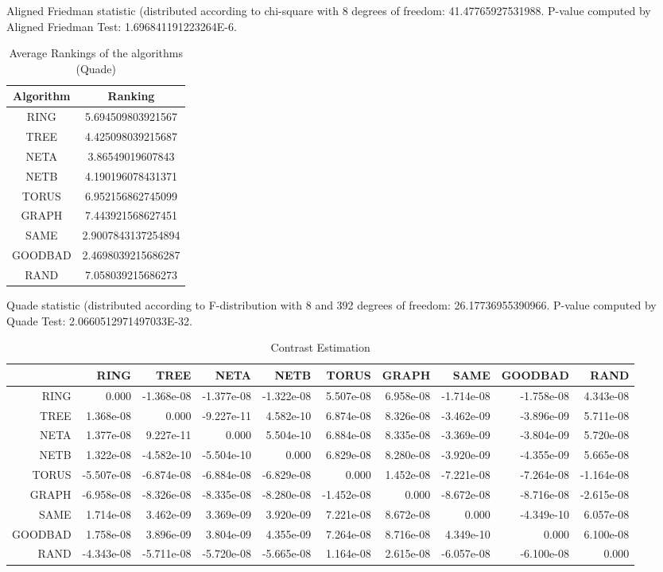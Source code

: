 \documentclass[a4paper,10pt]{article}
\begin{document}
\begin{landscape}
Aligned Friedman statistic (distributed according to chi-square with 8 degrees of freedom: 41.47765927531988. 
P-value computed by Aligned Friedman Test: 1.696841191223264E-6.\newline


\newpage

\begin{table}[!htp]
\centering
\caption{Average Rankings of the algorithms (Quade)
}\begin{tabular}{c|c}
Algorithm&Ranking\\
\hline
 RING&5.694509803921567\\
 TREE&4.425098039215687\\
 NETA&3.86549019607843\\
 NETB&4.190196078431371\\
 TORUS&6.952156862745099\\
 GRAPH&7.443921568627451\\
 SAME&2.9007843137254894\\
 GOODBAD&2.4698039215686287\\
 RAND&7.058039215686273\\
\end{tabular}
\end{table}
Quade statistic (distributed according to F-distribution with 8 and 392 degrees of freedom: 26.17736955390966. 
P-value computed by Quade Test: 2.0660512971497033E-32.\newline


\newpage

\begin{table}[!htp]
\centering\tiny
\caption{Contrast Estimation}
\begin{tabular}{
|r|r|r|r|r|r|r|r|r|r|}
\hline
 & RING& TREE& NETA& NETB& TORUS& GRAPH& SAME& GOODBAD& RAND\\
\hline
 RING&0.000&-1.368e-08&-1.377e-08&-1.322e-08&5.507e-08&6.958e-08&-1.714e-08&-1.758e-08&4.343e-08\\
\hline
 TREE&1.368e-08&0.000&-9.227e-11&4.582e-10&6.874e-08&8.326e-08&-3.462e-09&-3.896e-09&5.711e-08\\
\hline
 NETA&1.377e-08&9.227e-11&0.000&5.504e-10&6.884e-08&8.335e-08&-3.369e-09&-3.804e-09&5.720e-08\\
\hline
 NETB&1.322e-08&-4.582e-10&-5.504e-10&0.000&6.829e-08&8.280e-08&-3.920e-09&-4.355e-09&5.665e-08\\
\hline
 TORUS&-5.507e-08&-6.874e-08&-6.884e-08&-6.829e-08&0.000&1.452e-08&-7.221e-08&-7.264e-08&-1.164e-08\\
\hline
 GRAPH&-6.958e-08&-8.326e-08&-8.335e-08&-8.280e-08&-1.452e-08&0.000&-8.672e-08&-8.716e-08&-2.615e-08\\
\hline
 SAME&1.714e-08&3.462e-09&3.369e-09&3.920e-09&7.221e-08&8.672e-08&0.000&-4.349e-10&6.057e-08\\
\hline
 GOODBAD&1.758e-08&3.896e-09&3.804e-09&4.355e-09&7.264e-08&8.716e-08&4.349e-10&0.000&6.100e-08\\
\hline
 RAND&-4.343e-08&-5.711e-08&-5.720e-08&-5.665e-08&1.164e-08&2.615e-08&-6.057e-08&-6.100e-08&0.000\\
\hline


\end{tabular}
\end{table}
\end{landscape}
\end{document}
